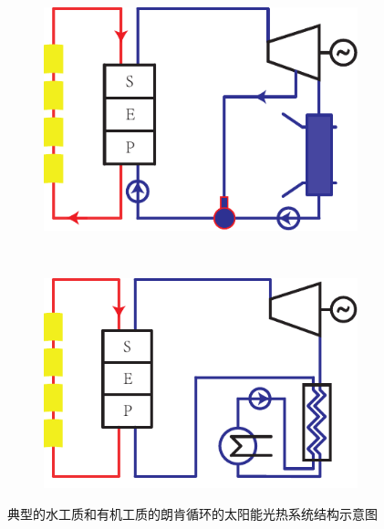 \noindent \begin{figure}[htbp]
\centering
	\begin{subfigure}[b]{0.4\columnwidth}
	\includegraphics[width = \columnwidth]{fig/TypicalSteamRankineSolarSystem}
	\caption{}\label{fig:TypicalSteamRankineSolarSystem}
	\end{subfigure}
	~
\begin{subfigure}[b]{0.4\columnwidth}
	\includegraphics[width = \columnwidth]{fig/TypicalOrganicRankineSolarSystem}
	\caption{}\label{fig:TypicalOrganicRankineSolarSystem}
	\end{subfigure}
	\caption{典型的水工质和有机工质的朗肯循环的太阳能光热系统结构示意图}
	\label{fig:TwoTypesOfRankineCycle}
\end{figure}

